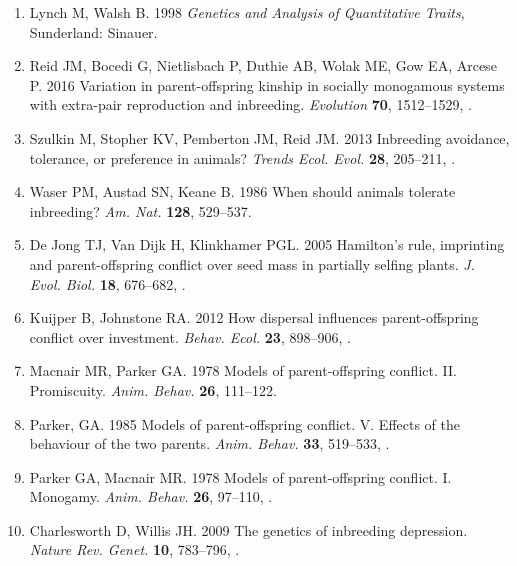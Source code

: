 \documentclass[12pt]{article}
\begin{document}
\begin{enumerate}
\item{Lynch M, Walsh B. 1998 \textit{{Genetics and Analysis of Quantitative
  Traits}}, Sunderland: Sinauer.}

\item{Reid JM, Bocedi G, Nietlisbach P, Duthie AB, Wolak ME, Gow
  EA, Arcese P. 2016 {Variation in parent-offspring kinship in socially
  monogamous systems with extra-pair reproduction and inbreeding}.
  \textit{Evolution} \textbf{70}, 1512--1529, .}

\item{Szulkin M, Stopher KV, Pemberton JM, Reid JM. 2013 {Inbreeding
  avoidance, tolerance, or preference in animals?} 
  \textit{Trends Ecol. Evol.} \textbf{28}, 205--211, 
  .}

\item{Waser PM, Austad SN, Keane B. 1986 {When should animals tolerate
  inbreeding?} \textit{Am. Nat.} \textbf{128}, 529--537.}

\item{{De Jong} TJ, {Van Dijk} H, Klinkhamer PGL. 2005 {Hamilton's
  rule, imprinting and parent-offspring conflict over seed mass in partially
  selfing plants}. \textit{J. Evol. Biol.} \textbf{18},
  676--682, .}

\item{Kuijper B, Johnstone RA. 2012 {How dispersal influences
  parent-offspring conflict over investment}. \textit{Behav. Ecol.}
  \textbf{23}, 898--906, .}

\item{Macnair MR, Parker GA. 1978 {Models of parent-offspring conflict. II.
  Promiscuity}. \textit{Anim. Behav.} \textbf{26}, 111--122.}

\item{Parker, GA. 1985 {Models of parent-offspring conflict. V. Effects of the
  behaviour of the two parents}. \textit{Anim. Behav.} \textbf{33},
  519--533, .}

\item{Parker GA, Macnair MR. 1978 {Models of parent-offspring conflict. I.
  Monogamy}. \textit{Anim. Behav.} \textbf{26}, 97--110,
  .}

\item{Charlesworth D, Willis JH. 2009 {The genetics of inbreeding
  depression}. \textit{Nature Rev. Genet.} \textbf{10}, 783--796,
  .}


\end{enumerate}
\end{document}
